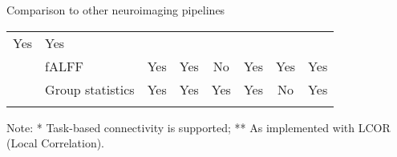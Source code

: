 \begin{tablebox}[label={table:comparison}]{Comparison to other neuroimaging pipelines}
\begin{tabularx}{\textwidth}{@{} | K{1.5cm} | K{2cm} | C | C | C | C | C | C | @{}}
Yes &%
Yes \\
\hhline{~|-|-|-|-|-|-|-|}
& fALFF &%
Yes &%
Yes &%
No &%
Yes &%
Yes &%
Yes \\
\hhline{~|-|-|-|-|-|-|-|}
& Group statistics &%
Yes &%
Yes &%
Yes &%
Yes &%
No &%
Yes \\
\hhline{-|-|-|-|-|-|-|-|}
\end{tabularx}\par
\vspace*{2mm}
Note: * Task-based connectivity is supported; ** As implemented with LCOR (Local Correlation).
\endgroup

\end{tablebox}
